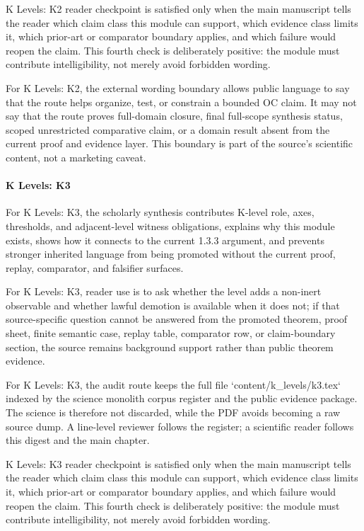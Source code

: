 K Levels: K2 reader checkpoint is satisfied only when the main manuscript tells the reader which claim class this module can support, which evidence class limits it, which prior-art or comparator boundary applies, and which failure would reopen the claim. This fourth check is deliberately positive: the module must contribute intelligibility, not merely avoid forbidden wording.


For K Levels: K2, the external wording boundary allows public language to say that the route helps organize, test, or constrain a bounded OC claim. It may not say that the route proves full-domain closure, final full-scope synthesis status, scoped unrestricted comparative claim, or a domain result absent from the current proof and evidence layer. This boundary is part of the source's scientific content, not a marketing caveat.


\paragraph{K Levels: K3}

For K Levels: K3, the scholarly synthesis contributes K-level role, axes, thresholds, and adjacent-level witness obligations, explains why this module exists, shows how it connects to the current 1.3.3 argument, and prevents stronger inherited language from being promoted without the current proof, replay, comparator, and falsifier surfaces.


For K Levels: K3, reader use is to ask whether the level adds a non-inert observable and whether lawful demotion is available when it does not; if that source-specific question cannot be answered from the promoted theorem, proof sheet, finite semantic case, replay table, comparator row, or claim-boundary section, the source remains background support rather than public theorem evidence.


For K Levels: K3, the audit route keeps the full file `content/k\_levels/k3.tex` indexed by the science monolith corpus register and the public evidence package. The science is therefore not discarded, while the PDF avoids becoming a raw source dump. A line-level reviewer follows the register; a scientific reader follows this digest and the main chapter.


K Levels: K3 reader checkpoint is satisfied only when the main manuscript tells the reader which claim class this module can support, which evidence class limits it, which prior-art or comparator boundary applies, and which failure would reopen the claim. This fourth check is deliberately positive: the module must contribute intelligibility, not merely avoid forbidden wording.


